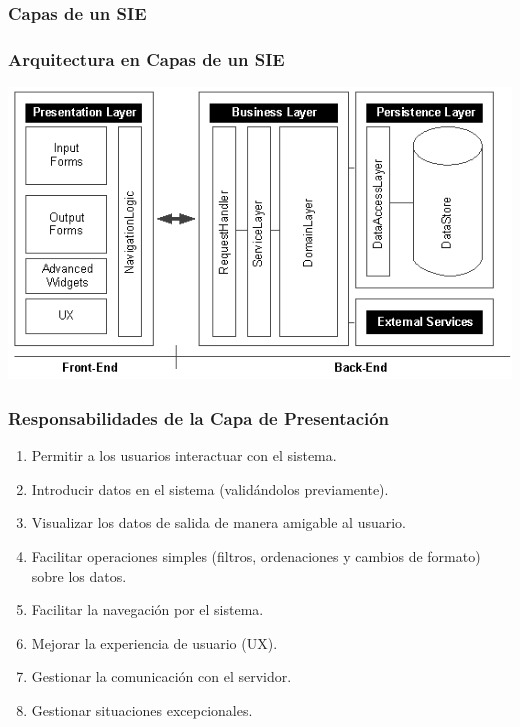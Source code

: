 \documentclass[a4paper,slidestop,xcolor=pst,dvips,blue]{beamer}
\begin{document}
\subsubsection{Capas de un SIE}

\begin{frame}[c]
	\frametitle{Arquitectura en Capas de un SIE}
	\begin{center}
        \includegraphics[width=\linewidth,keepaspectratio=true]{images/enterpriseLayers/enterpriseLayers.eps}
	\end{center}
\end{frame}

\begin{frame}[c]
	\frametitle{Responsabilidades de la Capa de Presentación}
	\begin{enumerate}[<+->]
        \item Permitir a los usuarios interactuar con el sistema.
        \item Introducir datos en el sistema (validándolos previamente).
        \item Visualizar los datos de salida de manera amigable al usuario.
        \item Facilitar operaciones simples (filtros, ordenaciones y cambios de formato) sobre los datos.
        \item Facilitar la navegación por el sistema.
        \item Mejorar la experiencia de usuario (UX). %
        \item Gestionar la comunicación con el servidor.
        \item Gestionar situaciones excepcionales.
	\end{enumerate}
\end{frame}
\end{document}
